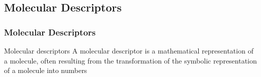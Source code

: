 \documentclass[aspectratio=169,dvipsnames]{beamer}
\begin{document}
    \subsection{Molecular Descriptors}
    \begin{frame}
        \frametitle{Molecular Descriptors}
                \begin{block}{Molecular descriptors} 
A molecular \alert{descriptor} is a \alert{mathematical representation} of a
molecule, often resulting from the \alert{transformation} of the \alert{symbolic
representation} of a molecule into \alert{numbers}
        \end{block}

    \end{frame}

    \newcommand\tm[2][]{\tikz[overlay,remember picture,baseline=(#1.base),inner sep=0pt]\node(#1){$#2$};}
\end{document}
